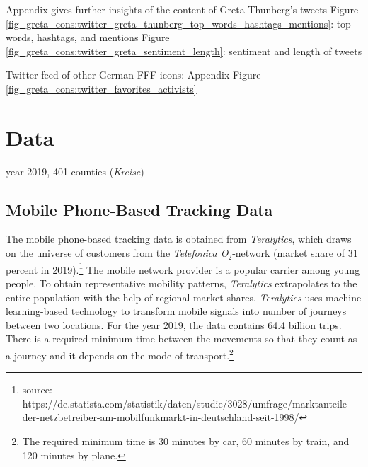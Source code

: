 \restoregeometry








Appendix gives further insights of the content of Greta Thunberg's tweets
Figure \ref{fig_greta_cons:twitter_greta_thunberg_top_words_hashtags_mentions}: top words, hashtags, and mentions
Figure \ref{fig_greta_cons:twitter_greta_sentiment_length}: sentiment and length of tweets


Twitter feed of other German FFF icons: Appendix Figure \ref{fig_greta_cons:twitter_favorites_activists}
















\newpage
\section{Data}\label{sec_greta_cons:data} 

year 2019, 401 counties (\textit{Kreise})


\subsection{Mobile Phone-Based Tracking Data}
The mobile phone-based tracking data is obtained from \textit{Teralytics}, which draws on the universe of customers from the \textit{Telefonica O$_2$}-network (market share of 31 percent in 2019).\footnote{source: https://de.statista.com/statistik/daten/studie/3028/umfrage/marktanteile-der-netzbetreiber-am-mobilfunkmarkt-in-deutschland-seit-1998/} The mobile network provider is a popular carrier among young people. To obtain representative mobility patterns, \textit{Teralytics} extrapolates to the entire population with the help of regional market shares. \textit{Teralytics} uses machine learning-based technology to transform mobile signals into number of journeys between two locations. For the year 2019, the data contains 64.4 billion trips. There is a required minimum time between the movements so that they count as a journey and it depends on the mode of transport.\footnote{The required minimum time is 30 minutes by car, 60 minutes by train, and 120 minutes by plane.} 


